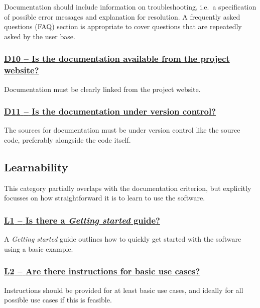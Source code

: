 \documentclass[a4paper,11pt]{article}
\newcommand{\indicator}[1]{\subsubsection*{\underline{#1}}}
\begin{document}
Documentation should include information on troubleshooting, i.e.\ a
specification of possible error messages and explanation for resolution. A
frequently asked questions (FAQ) section is appropriate to cover questions
that are repeatedly asked by the user base.

\newcommand{\dTenName}{D10}
\newcommand{\dTenID}{\dTenName}
\newcommand{\dTenText}{Is the documentation available from the project website?}
\indicator{\dTenName{ }--{ }\dTenText}\label{id:d10}

Documentation must be clearly linked from the project website.

\newcommand{\dElevenName}{D11}
\newcommand{\dElevenID}{\dElevenName}
\newcommand{\dElevenText}{Is the documentation under version control?}
\indicator{\dElevenName{ }--{ }\dElevenText}\label{id:d11}

The sources for documentation must be under version control like the source
code, preferably alongside the code itself.

\subsection{Learnability}\label{sec:lea}

This category partially overlaps with the documentation criterion, but explicitly
focusses on how straightforward it is to learn to use the software.

\newcommand{\lOneName}{L1}
\newcommand{\lOneID}{\lOneName}
\newcommand{\lOneText}{Is there a \textit{Getting started} guide?}
\indicator{\lOneName{ }--{ }\lOneText}\label{id:l1} %

A \textit{Getting started} guide outlines how to quickly get started with the software using a basic example.

\newcommand{\lTwoName}{L2}
\newcommand{\lTwoID}{\lTwoName}
\newcommand{\lTwoText}{Are there instructions for basic use cases?}
\indicator{\lTwoName{ }--{ }\lTwoText}\label{id:l2} 

Instructions should be provided for at least basic use cases, and ideally for
all possible use cases if this is feasible.

%
%
%
\end{document}
